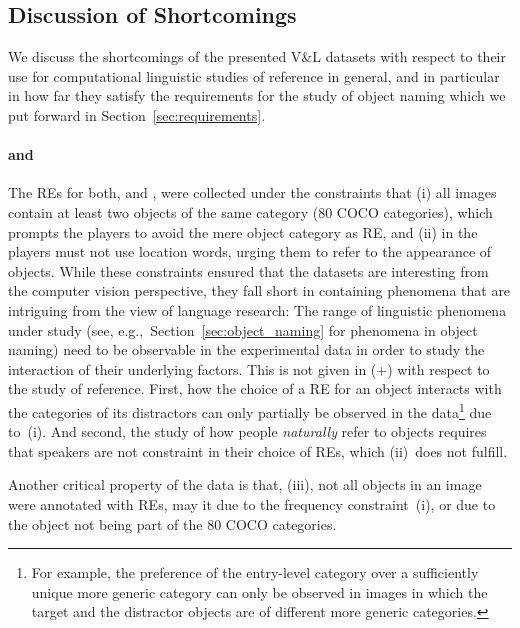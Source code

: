 {\subsection{Discussion of Shortcomings}
We discuss the shortcomings of the presented V\&L datasets with respect to their use for computational linguistic studies of reference in general, and in particular in how far they satisfy the requirements for the study of object naming which we put forward in  Section~\ref{sec:requirements}. 

\paragraph{ and }
The REs for both,  and , were collected under the constraints that (i) all images contain at least two objects of the same category (80 COCO categories), which prompts the players to avoid the mere object category as RE, and (ii) in  the players must not use location words, urging them to refer to the appearance of objects. 
%
While these constraints ensured that the datasets are interesting from the computer vision perspective, they fall short in containing phenomena that are intriguing from the view of language research: 
%
The range of linguistic phenomena under study (see, e.g.,~Section~\ref{sec:object_naming} for phenomena in object naming) need to be observable in the experimental data in order to study the interaction of their underlying factors. 
This is not given in (+) with respect to the study of reference. 
First, how the choice of a RE for an object interacts with the categories of its distractors can only partially be observed in the data\footnote{For example, the preference of the entry-level category over a sufficiently unique more generic category can only be observed in images in which the target and the distractor objects are of different more generic categories.} due to~(i). 
And second, the study of how people \textit{naturally} refer to objects requires that speakers are not constraint in their choice of REs, which (ii)~does not fulfill.

Another critical property of the data is that, (iii), not all objects in an image were annotated with REs, may it due to the frequency constraint~(i), or due to the object not being part of the 80 COCO categories. 


}
